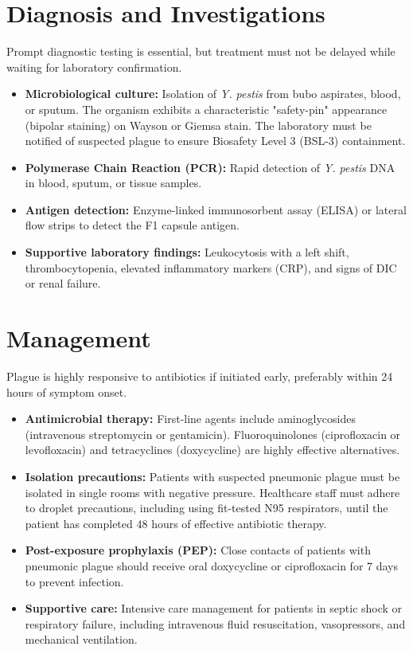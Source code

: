 \section*{Diagnosis and Investigations}
Prompt diagnostic testing is essential, but treatment must not be delayed while waiting for laboratory confirmation.
\begin{itemize}
    \item \textbf{Microbiological culture:} Isolation of \textit{Y. pestis} from bubo aspirates, blood, or sputum. The organism exhibits a characteristic "safety-pin" appearance (bipolar staining) on Wayson or Giemsa stain. The laboratory must be notified of suspected plague to ensure Biosafety Level 3 (BSL-3) containment.
    \item \textbf{Polymerase Chain Reaction (PCR):} Rapid detection of \textit{Y. pestis} DNA in blood, sputum, or tissue samples.
    \item \textbf{Antigen detection:} Enzyme-linked immunosorbent assay (ELISA) or lateral flow strips to detect the F1 capsule antigen.
    \item \textbf{Supportive laboratory findings:} Leukocytosis with a left shift, thrombocytopenia, elevated inflammatory markers (CRP), and signs of DIC or renal failure.
\end{itemize}

\section*{Management}
Plague is highly responsive to antibiotics if initiated early, preferably within 24 hours of symptom onset.
\begin{itemize}
    \item \textbf{Antimicrobial therapy:} First-line agents include aminoglycosides (intravenous streptomycin or gentamicin). Fluoroquinolones (ciprofloxacin or levofloxacin) and tetracyclines (doxycycline) are highly effective alternatives.
    \item \textbf{Isolation precautions:} Patients with suspected pneumonic plague must be isolated in single rooms with negative pressure. Healthcare staff must adhere to droplet precautions, including using fit-tested N95 respirators, until the patient has completed 48 hours of effective antibiotic therapy.
    \item \textbf{Post-exposure prophylaxis (PEP):} Close contacts of patients with pneumonic plague should receive oral doxycycline or ciprofloxacin for 7 days to prevent infection.
    \item \textbf{Supportive care:} Intensive care management for patients in septic shock or respiratory failure, including intravenous fluid resuscitation, vasopressors, and mechanical ventilation.
\end{itemize}

